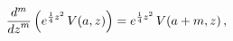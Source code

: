 \[\frac{{d}^{m}}{{dz}^{m}}\left(e^{\frac{1}{4}z^{2}}\mathop{V\/}\nolimits\!\left%
(a,z\right)\right)=e^{\frac{1}{4}z^{2}}\mathop{V\/}\nolimits\!\left(a+m,z%
\right),\]